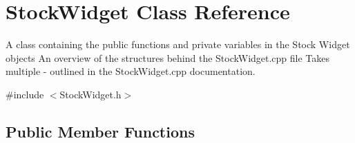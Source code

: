 \hypertarget{class_stock_widget}{}\section{Stock\+Widget Class Reference}
\label{class_stock_widget}


A class containing the public functions and private variables in the Stock Widget objects  An overview of the structures behind the Stock\+Widget.\+cpp file  Takes multiple -\/ outlined in the Stock\+Widget.\+cpp documentation.  




{\ttfamily \#include $<$Stock\+Widget.\+h$>$}

\subsection*{Public Member Functions}
